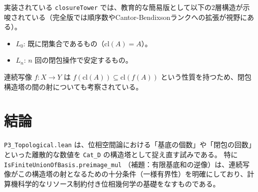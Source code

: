 \documentclass{ltjsarticle}
\theoremstyle{definition}
\theoremstyle{plain}
\begin{document}
実装されている \texttt{closureTower} では、教育的な簡易版として以下の2層構造が示唆されている（完全版では順序数やCantor-Bendixsonランクへの拡張が視野にある）。
\begin{itemize}
    \item $L_0$: 既に閉集合であるもの（$\text{cl}(A) = A$）。
    \item $L_n$: $n$ 回の閉包操作で安定するもの。
\end{itemize}

連続写像 $f: X \to Y$ は $f(\text{cl}(A)) \subseteq \text{cl}(f(A))$ という性質を持つため、閉包構造塔の間の射についても考察されている。

\section{結論}
\texttt{P3\_Topological.lean} は、位相空間論における「基底の個数」や「閉包の回数」といった離散的な数値を \texttt{Cat\_D} の構造塔として捉え直す試みである。
特に \texttt{IsFiniteUnionOfBasis.preimage\_mul} （補題：有限基底和の逆像）は、連続写像がこの構造塔の射となるための十分条件（一様有界性）を明確にしており、計算機科学的なリソース制約付き位相幾何学の基礎をなすものである。
\end{document}
